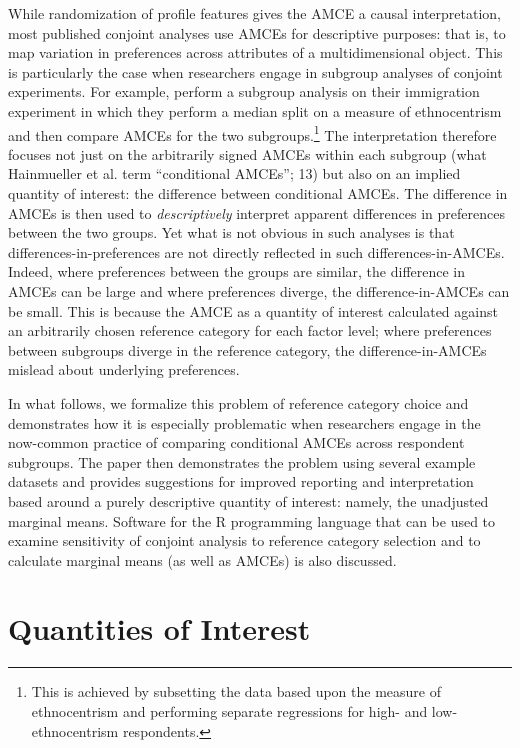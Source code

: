 \documentclass[a4paper,12pt]{article}\usepackage[]{graphicx}\usepackage[]{color}
\begin{document}
While randomization of profile features gives the AMCE a causal interpretation, most published conjoint analyses use AMCEs for descriptive purposes: that is, to map variation in preferences across attributes of a multidimensional object. This is particularly the case when researchers engage in subgroup analyses of conjoint experiments. For example, \citet{HainmuellerHopkinsYamamoto2014} perform a subgroup analysis on their immigration experiment in which they perform a median split on a measure of ethnocentrism and then compare AMCEs for the two subgroups.\footnote{This is achieved by subsetting the data based upon the measure of ethnocentrism and performing separate regressions for high- and low-ethnocentrism respondents.} The interpretation therefore focuses not just on the arbitrarily signed AMCEs within each subgroup (what Hainmueller et al. term ``conditional AMCEs''; 13) but also on an implied quantity of interest: the difference between conditional AMCEs. The difference in AMCEs is then used to \textit{descriptively} interpret apparent differences in preferences between the two groups. Yet what is not obvious in such analyses is that differences-in-preferences are not directly reflected in such differences-in-AMCEs. Indeed, where preferences between the groups are similar, the difference in AMCEs can be large and where preferences diverge, the difference-in-AMCEs can be small. This is because the AMCE as a quantity of interest calculated against an arbitrarily chosen reference category for each factor level; where preferences between subgroups diverge in the reference category, the difference-in-AMCEs mislead about underlying preferences.

In what follows, we formalize this problem of reference category choice and demonstrates how it is especially problematic when researchers engage in the now-common practice of comparing conditional AMCEs across respondent subgroups. The paper then demonstrates the problem using several example datasets and provides suggestions for improved reporting and interpretation based around a purely descriptive quantity of interest: namely, the unadjusted marginal means. Software for the R programming language that can be used to examine sensitivity of conjoint analysis to reference category selection and to calculate marginal means (as well as AMCEs) is also discussed.


\section{Quantities of Interest}\label{sec:quantities}
\end{document}
